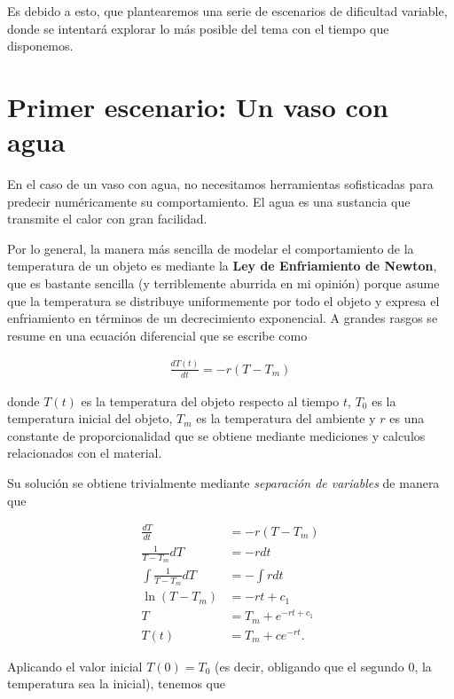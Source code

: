 \documentclass[letter]{tufte-handout} %
\begin{document}
Es debido a esto, que plantearemos una serie de escenarios de dificultad variable, donde
se intentará explorar lo más posible del tema con el tiempo que disponemos.


\section{Primer escenario: Un vaso con agua} \label{sec:scenario1}

En el caso de un vaso con agua, no necesitamos herramientas sofisticadas para predecir numéricamente
su comportamiento. El agua es una sustancia que transmite el calor con gran facilidad.

Por lo general, la manera más sencilla de modelar el comportamiento de la temperatura de un objeto
es mediante la \textbf{Ley de Enfriamiento de Newton}, que es bastante sencilla (y terriblemente
aburrida en mi opinión) porque asume que la temperatura se distribuye uniformemente por todo el
objeto y expresa el enfriamiento en términos de un decrecimiento exponencial. A grandes rasgos
se resume en una ecuación diferencial que se escribe como

\begin{align}
	\frac{dT(t)}{dt} = -r(T - T_m) \label{eq:ncl_edo}
\end{align}

donde $T(t)$ es la temperatura del objeto respecto al tiempo $t$, $T_0$ es la temperatura inicial del
objeto, $T_m$ es la temperatura del ambiente y $r$ es una constante de proporcionalidad que se obtiene
mediante mediciones y calculos relacionados con el material.

Su solución se obtiene trivialmente mediante \textit{separación de variables} de manera que

\begin{align*}
	\frac{dT}{dt}              & = -r(T - T_m)             \\
	\frac{1}{T - T_m} dT       & = -rdt                    \\
	\int{\frac{1}{T - T_m} dT} & = -\int{rdt}              \\
	\ln{(T - T_m)}             & = -rt + c_1               \\
	T                          & = T_m + e^{-rt + c_1}     \\
	T(t)                       & = T_m + ce^{-rt} \text{.}
\end{align*}

Aplicando el valor inicial $T(0) = T_0$ (es decir, obligando que el segundo 0, la temperatura sea la
inicial), tenemos que
\end{document}
